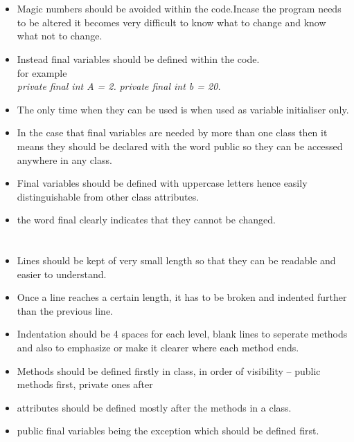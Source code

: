 \documentclass[12pt]{article}
\begin{document}
	\section{\bfseries\selectfont{Final Variables}}
	\begin{itemize}
		\item Magic numbers should be avoided within the code.Incase the program needs to be altered it becomes very difficult to know what to change and know what not to change.
		\item Instead final variables should be defined within the code.\\
		for example \\
		{\it private final int A  = 2.}
		{\it private final int b  = 20.}\\
		\item The only time when they can be used is when used as variable initialiser only.
		\item In the case that final variables are needed by more than one class then it means they should be declared with the word public so they can be accessed anywhere  in any class.
		\item Final variables should be defined with uppercase letters hence easily distinguishable from other class attributes.
		\item the word final clearly indicates that they cannot be changed.
	\end{itemize}
	
	\section{\bfseries\selectfont{Indentation and Layout}}
	\begin{itemize}
		\item Lines should be kept of very small length so that they can be readable and easier to understand.
		\item Once a line reaches a certain length, it has to be broken 	and indented further than the previous line.
		\item Indentation should be 4 spaces for each level, blank lines to seperate methods and also to emphasize or make it clearer where each method ends.
		\item Methods should be defined firstly in  class,  in 	order of visibility – public methods first, private ones after
		\item attributes should be defined mostly after the methods in a class.
		\item public final variables being the exception which should be defined first.
	\end{itemize}
	
\end{document}
